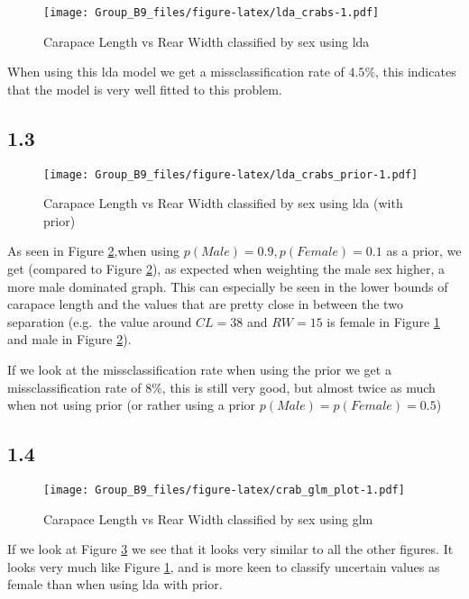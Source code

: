 \documentclass[]{article}
\begin{document}
\begin{figure}
\centering
\texttt{[image: Group\_B9\_files/figure-latex/lda\_crabs-1.pdf]}
\caption{\label{fig:crabs_lda} Carapace Length vs Rear Width classified
by sex using lda}
\end{figure}

When using this lda model we get a missclassification rate of \(4.5\%\),
this indicates that the model is very well fitted to this problem.

\subsection{1.3}\label{section-2}

\begin{figure}
\centering
\texttt{[image: Group\_B9\_files/figure-latex/lda\_crabs\_prior-1.pdf]}
\caption{\label{fig:crabs_lda_prior} Carapace Length vs Rear Width
classified by sex using lda (with prior)}
\end{figure}

As seen in Figure \ref{fig:crabs_lda_prior},when using
\(p(Male)=0.9, p(Female)=0.1\) as a prior, we get (compared to Figure
\ref{fig:crabs_lda_prior}), as expected when weighting the male sex
higher, a more male dominated graph. This can especially be seen in the
lower bounds of carapace length and the values that are pretty close in
between the two separation (e.g.~the value around \(CL=38\) and
\(RW=15\) is female in Figure \ref{fig:crabs_lda} and male in Figure
\ref{fig:crabs_lda_prior}).

If we look at the missclassification rate when using the prior we get a
missclassification rate of \(8\%\), this is still very good, but almost
twice as much when not using prior (or rather using a prior
\(p(Male)=p(Female)=0.5\))

\subsection{1.4}\label{section-3}

\begin{figure}
\centering
\texttt{[image: Group\_B9\_files/figure-latex/crab\_glm\_plot-1.pdf]}
\caption{\label{fig:crabs_glm} Carapace Length vs Rear Width classified
by sex using glm}
\end{figure}

If we look at Figure \ref{fig:crabs_glm} we see that it looks very
similar to all the other figures. It looks very much like Figure
\ref{fig:crabs_lda}, and is more keen to classify uncertain values as
female than when using lda with prior.
\end{document}
